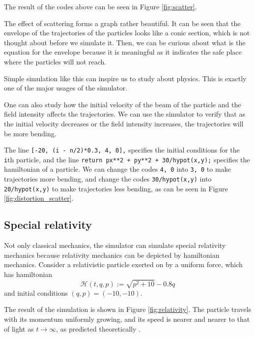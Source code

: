 \documentclass[12pt]{article}
\begin{document}
The result of the codes above can be seen in Figure \ref{fig:scatter}.

The effect of scattering forms a graph rather beautiful.
It can be seen that the envelope of the trajectories of the particles
looks like a conic section, which is not thought about before we simulate it.
Then, we can be curious about what is the equation for the envelope
because it is meaningful as it indicates the safe place
where the particles will not reach.

Simple simulation like this can inspire us to study about physics.
This is exactly one of the major usages of the simulator.

One can also study how the initial velocity of the beam of the particle and the field intensity affects the trajectories.
We can use the simulator to verify that as the initial velocity decreases or the field intensity increases, the trajectories will be more bending.

The line \texttt{[-20, (i - n/2)*0.3, 4, 0],} specifies the initial conditions for the \texttt{i}th particle,
and the line \texttt{return px**2 + py**2 + 30/hypot(x,y);} specifies the hamiltonian of a particle.
We can change the codes \texttt{4, 0} into \texttt{3, 0} to make trajectories more bending,
and change the codes \texttt{30/hypot(x,y)} into \texttt{20/hypot(x,y)} to make trajectories less bending,
as can be seen in Figure \ref{fig:distortion_scatter}.

\subsection{Special relativity}

Not only classical mechanics, the simulator can simulate special relativity mechanics
because relativity mechanics can be depicted by hamiltonian mechanics.
Consider a relativistic particle exerted on by a uniform force,
which has hamiltonian \cite[p. 28]{landau2010fields}
\begin{equation*}
  \mathcal H\!\left(t,q,p\right):=\sqrt{p^2+10}-0.8q
\end{equation*}
and initial conditions $\left(q,p\right)=\left(-10,-10\right)$.

The result of the simulation is shown in Figure \ref{fig:relativity}.
The particle travels with its momentum uniformly growing,
and its speed is nearer and nearer to that of light as $t\rightarrow\infty$,
as predicted theoretically \cite[p. 24]{landau2010fields}.
\end{document}
